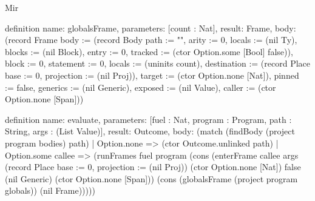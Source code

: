 \begin{lexlean}{Mir}
\begin{semanticmodule}
definition{
  name: globalsFrame,
  parameters: [count : Nat],
  result: Frame,
  body: (record Frame {body := (record Body {path := "", arity := 0, locals := (nil Ty), blocks := (nil Block), entry := 0, tracked := (ctor Option.some [Bool] false)}), block := 0, statement := 0, locals := (uninits count), destination := (record Place {base := 0, projection := (nil Proj)}), target := (ctor Option.none [Nat]), pinned := false, generics := (nil Generic), exposed := (nil Value), caller := (ctor Option.none [Span])})
}

definition{
  name: evaluate,
  parameters: [fuel : Nat, program : Program, path : String, args : (List Value)],
  result: Outcome,
  body: (match (findBody (project program bodies) path)
    | Option.none => (ctor Outcome.unlinked path)
    | Option.some callee => (runFrames fuel program (cons (enterFrame callee args (record Place {base := 0, projection := (nil Proj)}) (ctor Option.none [Nat]) false (nil Generic) (ctor Option.none [Span])) (cons (globalsFrame (project program globals)) (nil Frame)))))
}
\end{semanticmodule}
\end{lexlean}
